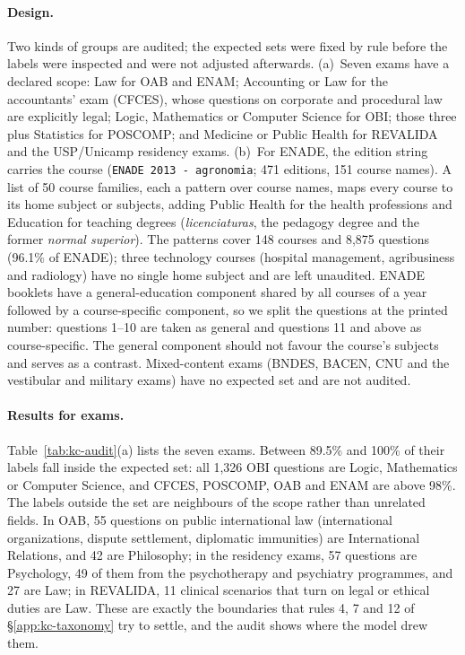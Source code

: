 \paragraph{Design.} Two kinds of groups are audited; the expected sets were
fixed by rule before the labels were inspected and were not adjusted
afterwards. (a)~Seven exams have a declared scope: Law for OAB and ENAM;
Accounting or Law for the accountants' exam (CFCES), whose questions on
corporate and procedural law are explicitly legal; Logic, Mathematics or
Computer Science for OBI; those three plus Statistics for POSCOMP; and
Medicine or Public Health for REVALIDA and the USP/Unicamp residency exams.
(b)~For ENADE, the edition string carries the course
(\texttt{ENADE 2013 - agronomia}; 471 editions, 151 course names). A list of
50 course families, each a pattern over course names, maps every course to
its home subject or subjects, adding Public Health for the health professions
and Education for teaching degrees (\emph{licenciaturas}, the pedagogy degree
and the former \emph{normal superior}). The patterns cover 148 courses and
8,875 questions (96.1\% of ENADE); three technology courses (hospital
management, agribusiness and radiology) have no single home subject and are
left unaudited. ENADE booklets have a general-education component shared by
all courses of a year followed by a course-specific component, so we split the
questions at the printed number: questions 1--10 are taken as general and
questions 11 and above as course-specific. The general component should not
favour the course's subjects and serves as a contrast. Mixed-content exams
(BNDES, BACEN, CNU and the vestibular and military exams) have no expected
set and are not audited.

\paragraph{Results for exams.} Table~\ref{tab:kc-audit}(a) lists the
seven exams. Between 89.5\% and 100\% of their labels fall inside the
expected set: all 1,326 OBI questions are Logic, Mathematics or Computer
Science, and CFCES, POSCOMP, OAB and ENAM are above 98\%. The labels outside
the set are neighbours of the scope rather than unrelated fields. In OAB, 55
questions on public international law (international organizations, dispute
settlement, diplomatic immunities) are International Relations, and 42 are
Philosophy; in the residency exams, 57 questions are Psychology, 49 of them
from the psychotherapy and psychiatry programmes, and 27 are Law; in
REVALIDA, 11 clinical scenarios that turn on legal or ethical duties are Law.
These are exactly the boundaries that rules 4, 7 and 12 of
\S\ref{app:kc-taxonomy} try to settle, and the audit shows where the model
drew them.

